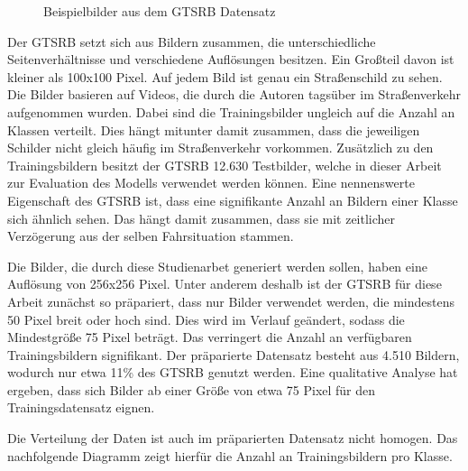 \begin{figure}[H]
\begin{subfigure}[b]{0.125\textwidth}
    \caption{}
    \label{fig:gtrsb-paper-bsp-image-4}
\end{subfigure}
      \caption{Beispielbilder aus dem \acs{GTSRB} Datensatz \cite{GTSRB}}
      \label{fig:gtrsb-paper-bsp-images}
\end{figure}

Der \ac{GTSRB} setzt sich aus Bildern zusammen, die unterschiedliche Seitenverhältnisse und verschiedene Auflösungen besitzen. Ein Großteil davon ist kleiner als 100x100 Pixel. Auf jedem Bild ist genau ein Straßenschild zu sehen. Die Bilder basieren auf Videos, die durch die Autoren tagsüber im Straßenverkehr aufgenommen wurden. Dabei sind die Trainingsbilder ungleich auf die Anzahl an Klassen verteilt. Dies hängt mitunter damit zusammen, dass die jeweiligen Schilder nicht gleich häufig im Straßenverkehr vorkommen. Zusätzlich zu den Trainingsbildern besitzt der \ac{GTSRB} 12.630 Testbilder, welche in dieser Arbeit zur Evaluation des Modells verwendet werden können. Eine nennenswerte Eigenschaft des \ac{GTSRB} ist, dass eine signifikante Anzahl an Bildern einer Klasse sich ähnlich sehen. Das hängt damit zusammen, dass sie mit zeitlicher Verzögerung aus der selben Fahrsituation stammen. \cite{GTSRB}

Die Bilder, die durch diese Studienarbet generiert werden sollen, haben eine Auflösung von 256x256 Pixel. Unter anderem deshalb ist der \ac{GTSRB} für diese Arbeit zunächst so präpariert, dass nur Bilder verwendet werden, die mindestens 50 Pixel breit oder hoch sind. Dies wird im Verlauf geändert, sodass die Mindestgröße 75 Pixel beträgt. Das verringert die Anzahl an verfügbaren Trainingsbildern signifikant. Der präparierte Datensatz besteht aus 4.510 Bildern, wodurch nur etwa 11\% des \ac{GTSRB} genutzt werden. Eine qualitative Analyse hat ergeben, dass sich Bilder ab einer Größe von etwa 75 Pixel für den Trainingsdatensatz eignen.

Die Verteilung der Daten ist auch im präparierten Datensatz nicht homogen. Das nachfolgende Diagramm zeigt hierfür die Anzahl an Trainingsbildern pro Klasse.



